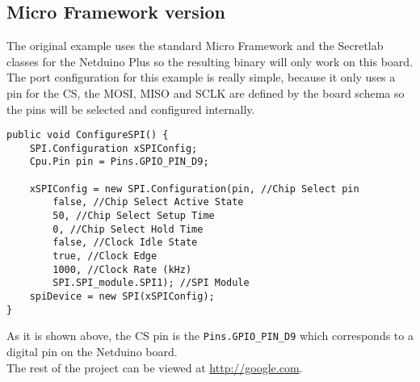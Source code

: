\subsection{Micro Framework version}\label{S:IOEx-SPI-Netduino}
The original example uses the standard Micro Framework and the Secretlab classes for the Netduino Plus so the resulting binary will only work on this board. The port configuration for this example is really simple, because it only uses a pin for the \gls{CS}, the \gls{MOSI}, \gls{MISO} and \gls{SCLK} are defined by the board schema so the pins will be selected and configured internally.

\begin{lstlisting}[language=CSharp, caption={SPIApi.cs - Configuring SPI for the MFRC522 in Netduino Plus}]
public void ConfigureSPI() {
    SPI.Configuration xSPIConfig;
    Cpu.Pin pin = Pins.GPIO_PIN_D9;

    xSPIConfig = new SPI.Configuration(pin, //Chip Select pin
        false, //Chip Select Active State
        50, //Chip Select Setup Time
        0, //Chip Select Hold Time
        false, //Clock Idle State
        true, //Clock Edge
        1000, //Clock Rate (kHz)
        SPI.SPI_module.SPI1); //SPI Module
    spiDevice = new SPI(xSPIConfig);
}
\end{lstlisting}
As it is shown above, the \gls{CS} pin is the \verb!Pins.GPIO_PIN_D9! which corresponds to a digital pin on the Netduino board.
\\
The rest of the project can be viewed at \url{http://google.com}.


